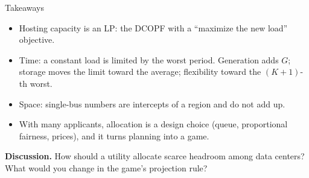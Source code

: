 \documentclass[aspectratio=169,11pt]{beamer}
\begin{document}
\begin{frame}{Takeaways}
  \begin{itemize}
    \item Hosting capacity is an LP: the DCOPF with a ``maximize the new load''
      objective.
    \item Time: a constant load is limited by the \alert{worst} period.
      Generation adds $G$; storage moves the limit toward the
      \alert{average}; flexibility toward the $(K{+}1)$-th worst.
    \item Space: single-bus numbers are intercepts of a region and
      \alert{do not add up}.
    \item With many applicants, allocation is a design choice (queue,
      proportional fairness, prices), and it turns planning into a game.
  \end{itemize}
  \vspace{0.6em}
  \textbf{Discussion.} How should a utility allocate scarce headroom among
  data centers? What would you change in the game's projection rule?
\end{frame}
\end{document}
